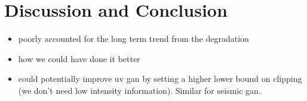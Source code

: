 \documentclass[11pt,a4paper,onecolumn]{report}
\begin{document}
%
%
%
%
%
\chapter{Discussion and Conclusion}
\label{chap:discussion}
%
%
%
%
%

\begin{itemize}
  \item poorly accounted for the long term trend from the degradation
  \item how we could have done it better
  \item could potentially improve uv gan by setting a higher lower bound on
  clipping (we don't need low intensity information). Similar for seismic gan.
\end{itemize}











\end{document}
